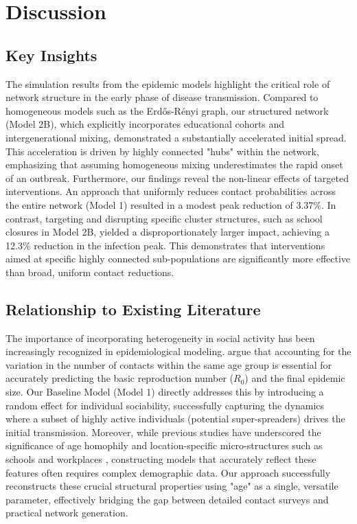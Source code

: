 \section{Discussion}

\subsection{Key Insights}
The simulation results from the epidemic models highlight the critical role of network structure in the early phase of disease transmission.
Compared to homogeneous models such as the Erd\H{o}s-R\'enyi graph, our structured network (Model 2B), which explicitly incorporates educational cohorts and intergenerational mixing, demonstrated a substantially accelerated initial spread.
This acceleration is driven by highly connected "hubs" within the network, emphasizing that assuming homogeneous mixing underestimates the rapid onset of an outbreak.
Furthermore, our findings reveal the non-linear effects of targeted interventions.
An approach that uniformly reduces contact probabilities across the entire network (Model 1) resulted in a modest peak reduction of 3.37\%.
In contrast, targeting and disrupting specific cluster structures, such as school closures in Model 2B, yielded a disproportionately larger impact, achieving a 12.3\% reduction in the infection peak.
This demonstrates that interventions aimed at specific highly connected sub-populations are significantly more effective than broad, uniform contact reductions.

\subsection{Relationship to Existing Literature}
The importance of incorporating heterogeneity in social activity has been increasingly recognized in epidemiological modeling.
\textcite{britton2025improving} argue that accounting for the variation in the number of contacts within the same age group is essential for accurately predicting the basic reproduction number ($R_0$) and the final epidemic size.
Our Baseline Model (Model 1) directly addresses this by introducing a random effect for individual sociability, successfully capturing the dynamics where a subset of highly active individuals (potential super-spreaders) drives the initial transmission.
Moreover, while previous studies have underscored the significance of age homophily \parencite{mossong2008social} and location-specific micro-structures such as schools and workplaces \parencite{prem2017projecting}, constructing models that accurately reflect these features often requires complex demographic data.
Our approach successfully reconstructs these crucial structural properties using "age" as a single, versatile parameter, effectively bridging the gap between detailed contact surveys and practical network generation.

